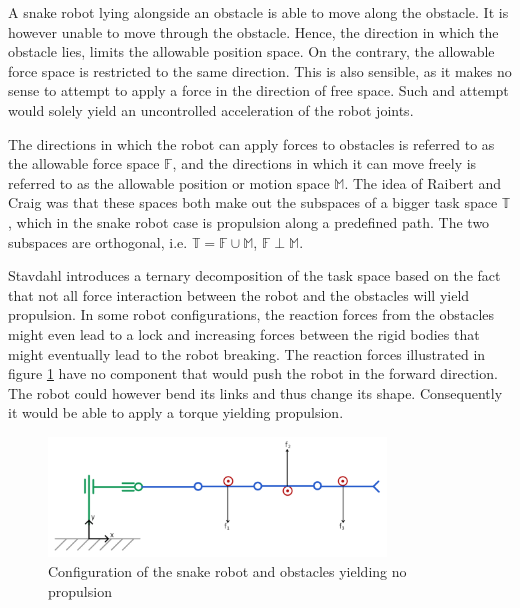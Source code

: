A snake robot lying alongside an obstacle is able to move along the obstacle. It is however unable to move through the obstacle. Hence, the direction in which the obstacle lies, limits the allowable position space. On the contrary, the allowable force space is restricted to the same direction. 
This is also sensible, as it makes no sense to attempt to apply a force in the direction of free space. Such and attempt would solely yield an uncontrolled acceleration of the robot joints.




The directions in which the robot can apply forces to obstacles is referred to as the allowable force space $\mathbb{F}$, and the directions in which it can move freely is referred to as the allowable position or motion space $\mathbb{M}$. The idea of Raibert and Craig \cite{raibert1981hybrid} was that these spaces both make out the subspaces of a bigger task space $\mathbb{T}$, which in the snake robot case is propulsion along a predefined path. The two subspaces are orthogonal, i.e. $\mathbb{T}=\mathbb{F}\cup\mathbb{M}$, $\mathbb{F}\perp\mathbb{M}$.

Stavdahl \cite{StavdahlNote} introduces a ternary decomposition of the task space based on the fact that not all force interaction between the robot and the obstacles will yield propulsion. In some robot configurations, the reaction forces from the obstacles might even lead to a lock and increasing forces between the rigid bodies that might eventually lead to the robot breaking. The reaction forces illustrated in figure \ref{fig:noprop} have no component that would push the robot in the forward direction. The robot could however bend its links and thus change its shape. Consequently it would be able to apply a torque yielding propulsion.

\begin{figure}[h!]
    \centering
    \includegraphics[width=0.8\textwidth]{figures/no_propulsion.PNG}
    \caption{Configuration of the snake robot and obstacles yielding no propulsion}
    \label{fig:noprop}
\end{figure}

